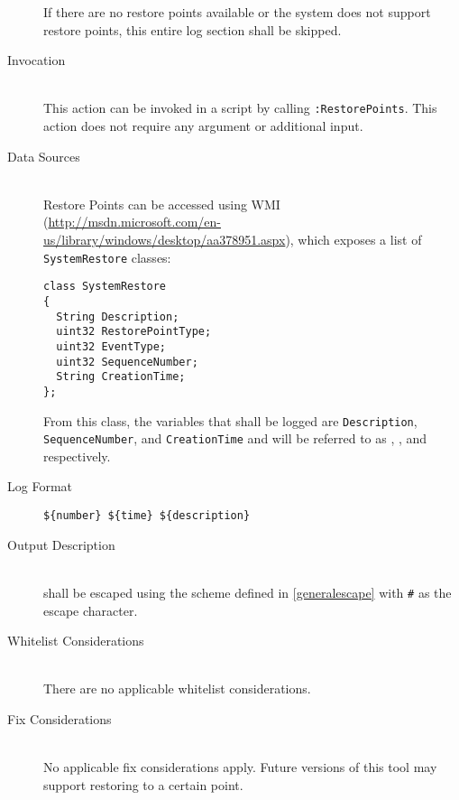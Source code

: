\begin{description}
If there are no restore points available or the system does not support restore
points, this entire log section shall be skipped.
\item[Invocation] \hfill \\
This action can be invoked in a script by calling \verb|:RestorePoints|.
This action does not require any argument or additional input.
\item[Data Sources] \hfill \\
Restore Points can be accessed using WMI
(\url{http://msdn.microsoft.com/en-us/library/windows/desktop/aa378951.aspx}),
which exposes a list of \texttt{SystemRestore} classes:
\vspace{-\baselineskip}
\begin{verbatim}
class SystemRestore
{
  String Description;
  uint32 RestorePointType;
  uint32 EventType;
  uint32 SequenceNumber;
  String CreationTime;
};
\end{verbatim}
From this class, the variables that shall be logged are \texttt{Description},
\texttt{SequenceNumber}, and \texttt{CreationTime} and will be referred to as
, , and  respectively.
\item[Log Format] \hfill
\vspace{-\baselineskip}
\begin{verbatim}
${number} ${time} ${description}
\end{verbatim}
\item[Output Description] \hfill \\
 shall be escaped using the scheme defined in
\ref{generalescape} with \verb|#| as the escape character.  
\item[Whitelist Considerations] \hfill \\
There are no applicable whitelist considerations.
\item[Fix Considerations] \hfill \\
No applicable fix considerations apply.  Future versions of this tool may
support restoring to a certain point.  
\end{description}

